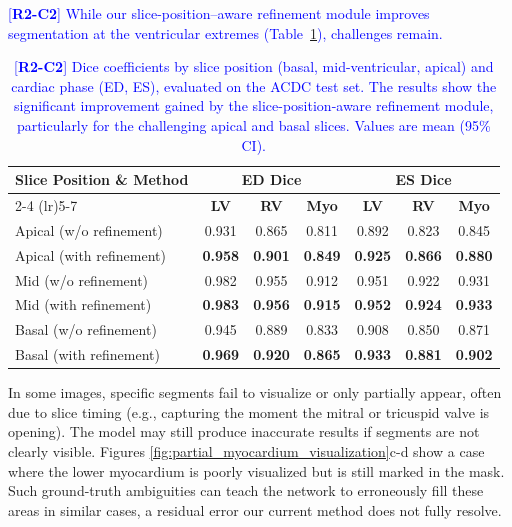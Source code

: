 \documentclass[fleqn,10pt]{wlscirep}
\newcommand{\revtag}[2]{[\textbf{R#1-C#2}]}
\newcommand{\Rtwo}[1]{\textcolor{blue}{#1}}
\begin{document}
\Rtwo{\revtag{2}{2} While our slice-position--aware refinement module improves segmentation at the ventricular extremes (Table~\ref{tab:apical_basal_performance}), challenges remain.}

\begin{table}[ht]
  \centering
  \caption{\Rtwo{\revtag{2}{2} Dice coefficients by slice position (basal, mid-ventricular, apical) and cardiac phase (ED, ES), evaluated on the ACDC test set.  The results show the significant improvement gained by the slice-position-aware refinement module, particularly for the challenging apical and basal slices. Values are mean (95\% CI).}}
  \label{tab:apical_basal_performance}
  \begin{tabular}{lcccccc}
    \toprule
    \multirow{2}{*}{\textbf{Slice Position \& Method}} & \multicolumn{3}{c}{\textbf{ED Dice}} & \multicolumn{3}{c}{\textbf{ES Dice}} \\
    \cmidrule(lr){2-4} \cmidrule(lr){5-7}
    & \textbf{LV} & \textbf{RV} & \textbf{Myo} & \textbf{LV} & \textbf{RV} & \textbf{Myo} \\
    \midrule
    Apical (w/o refinement) & 0.931 & 0.865 & 0.811 & 0.892 & 0.823 & 0.845 \\
    Apical (with refinement) & \textbf{0.958} & \textbf{0.901} & \textbf{0.849} & \textbf{0.925} & \textbf{0.866} & \textbf{0.880} \\
    \midrule
    Mid (w/o refinement) & 0.982 & 0.955 & 0.912 & 0.951 & 0.922 & 0.931 \\
    Mid (with refinement) & \textbf{0.983} & \textbf{0.956} & \textbf{0.915} & \textbf{0.952} & \textbf{0.924} & \textbf{0.933} \\
    \midrule
    Basal (w/o refinement) & 0.945 & 0.889 & 0.833 & 0.908 & 0.850 & 0.871 \\
    Basal (with refinement) & \textbf{0.969} & \textbf{0.920} & \textbf{0.865} & \textbf{0.933} & \textbf{0.881} & \textbf{0.902} \\
    \bottomrule
  \end{tabular}
\end{table}

In some images, specific segments fail to visualize or only partially appear, often due to slice timing (e.g., capturing the moment the mitral or tricuspid valve is opening). The model may still produce inaccurate results if segments are not clearly visible. Figures \ref{fig:partial_myocardium_visualization}c-d show a case where the lower myocardium is poorly visualized but is still marked in the mask. Such ground-truth ambiguities can teach the network to erroneously fill these areas in similar cases, a residual error our current method does not fully resolve.
\end{document}
